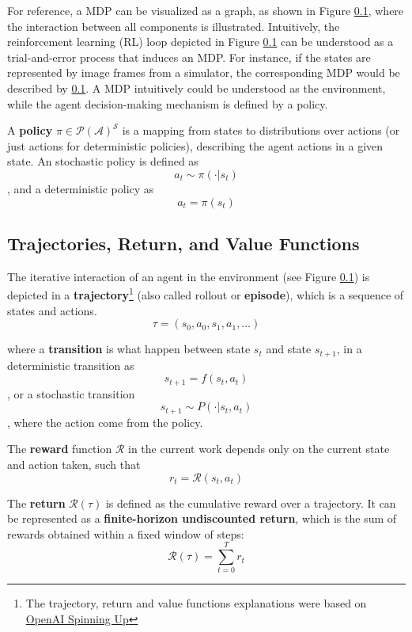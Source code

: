For reference, a MDP can be visualized as a graph, as shown in Figure \ref{}, where the interaction between all components is illustrated. Intuitively, the reinforcement learning (RL) loop depicted in Figure \ref{} can be understood as a trial-and-error process that induces an MDP. For instance, if the states are represented by image frames from a simulator, the corresponding MDP would be described by \ref{}. A MDP intuitively could be understood as the environment, while the agent decision-making mechanism is defined by a policy.

A \textbf{policy} $\pi \in \mathcal{P}(\mathcal{A})^\mathcal{S}$ is a mapping from states to distributions over actions (or just actions for deterministic policies), describing the agent actions in a given state. An stochastic policy is defined as
\begin{equation}
    a_t \sim \pi(\cdot|s_t)
\end{equation}
, and a deterministic policy as 
\begin{equation}
a_t = \pi(s_t)    
\end{equation} 

\subsection{Trajectories, Return, and Value Functions}

The iterative interaction of an agent in the environment (see Figure \ref{}) is depicted in a \textbf{trajectory}\footnote{The trajectory, return and value functions explanations were based on \href{https://spinningup.openai.com/en/latest/spinningup/rl_intro.html}{OpenAI Spinning Up}} (also called rollout or \textbf{episode}), which is a sequence of states and actions.
$$\tau = (s_0, a_0, s_1, a_1, \dots )$$

where a \textbf{transition} is what happen between state $s_t$ and state $s_{t+1}$, in a deterministic transition as 
$$s_{t+1} = f(s_t, a_t)$$, 
or a stochastic transition $$s_{t+1} \sim P(\cdot | s_t, a_t)$$, where the action come from the policy.

The \textbf{reward} function $\mathcal{R}$ in the current work depends only on the current state and action taken, such that
$$r_t = \mathcal{R}(s_t,a_t)$$

The \textbf{return} $\mathcal{R}(\tau)$ is defined as the cumulative reward over a trajectory. It can be represented as a \textbf{finite-horizon undiscounted return}, which is the sum of rewards obtained within a fixed window of steps:
$$\mathcal{R}(\tau) = \sum_{t=0}^T r_t$$


